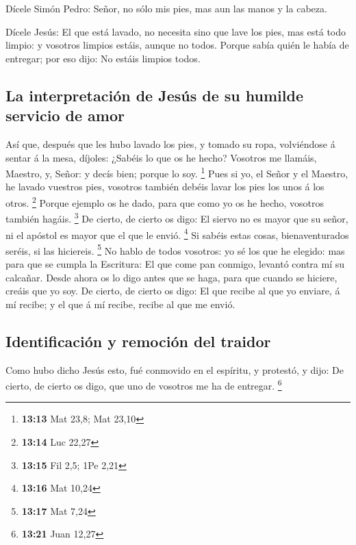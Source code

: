  Dícele Simón Pedro: Señor, no sólo mis pies, mas aun las
manos y la cabeza.

 Dícele Jesús: El que está lavado, no necesita sino que
lave los pies, mas está todo limpio: y vosotros limpios estáis, aunque
no todos.  Porque sabía quién le había de entregar; por
eso dijo: No estáis limpios todos.

\hypertarget{la-interpretaciuxf3n-de-jesuxfas-de-su-humilde-servicio-de-amor}{%
\subsection{La interpretación de Jesús de su humilde servicio de
amor}\label{la-interpretaciuxf3n-de-jesuxfas-de-su-humilde-servicio-de-amor}}

 Así que, después que les hubo lavado los pies, y tomado
su ropa, volviéndose á sentar á la mesa, díjoles: ¿Sabéis lo que os he
hecho?  Vosotros me llamáis, Maestro, y, Señor: y decís
bien; porque lo soy. \footnote{\textbf{13:13} Mat 23,8; Mat 23,10}
 Pues si yo, el Señor y el Maestro, he lavado vuestros
pies, vosotros también debéis lavar los pies los unos á los otros.
\footnote{\textbf{13:14} Luc 22,27}  Porque ejemplo os he
dado, para que como yo os he hecho, vosotros también hagáis. \footnote{\textbf{13:15}
  Fil 2,5; 1Pe 2,21}  De cierto, de cierto os digo: El
siervo no es mayor que su señor, ni el apóstol es mayor que el que le
envió. \footnote{\textbf{13:16} Mat 10,24}  Si sabéis
estas cosas, bienaventurados seréis, si las hiciereis. \footnote{\textbf{13:17}
  Mat 7,24}  No hablo de todos vosotros: yo sé los que he
elegido: mas para que se cumpla la Escritura: El que come pan conmigo,
levantó contra mí su calcañar.  Desde ahora os lo digo
antes que se haga, para que cuando se hiciere, creáis que yo soy.
 De cierto, de cierto os digo: El que recibe al que yo
enviare, á mí recibe; y el que á mí recibe, recibe al que me envió.

\hypertarget{identificaciuxf3n-y-remociuxf3n-del-traidor}{%
\subsection{Identificación y remoción del
traidor}\label{identificaciuxf3n-y-remociuxf3n-del-traidor}}

 Como hubo dicho Jesús esto, fué conmovido en el
espíritu, y protestó, y dijo: De cierto, de cierto os digo, que uno de
vosotros me ha de entregar. \footnote{\textbf{13:21} Juan 12,27}


